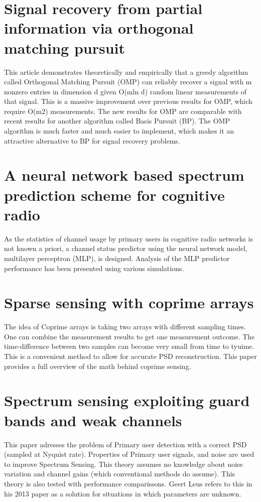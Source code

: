 \documentclass[report, oneside, a4paper, openany]{memoir}
\begin{document}
\section{Signal recovery from partial information via orthogonal matching pursuit \cite{tropp2005signal}}
This article demonstrates theoretically and empirically that a greedy algorithm called
Orthogonal Matching Pursuit (OMP) can reliably recover a signal with m nonzero entries in dimension
d given O(mln d) random linear measurements of that signal. This is a massive improvement
over previous results for OMP, which require O(m2) measurements. The new results for OMP are
comparable with recent results for another algorithm called Basis Pursuit (BP). The OMP algorithm
is much faster and much easier to implement, which makes it an attractive alternative to BP
for signal recovery problems.
\section{A neural network based spectrum prediction scheme for cognitive radio \cite{tumuluru2010neural}}
As the statistics of channel usage by primary users in cognitive radio networks is not known a priori, a channel status predictor using the neural network model, multilayer perceptron (MLP), is designed. Analysis of the MLP predictor performance has been presented using various simulations.
\section{Sparse sensing with coprime arrays \cite{vaidyanathan2010sparse}}
The idea of Coprime arrays is taking two arrays with different sampling times. One can combine the measurement results to get one measurement outcome. The time-difference between two samples can become very small from time to tyuime. This is a convenient method to allow for accurate PSD reconstruction. This paper provides a full overview of the math behind coprime sensing.
\section{Spectrum sensing exploiting guard bands and weak channels \cite{vazquez2011spectrum}}
This paper adresses the problem of Primary user detection with a correct PSD (sampled at Nyquist rate). Properties of Primary user signals, and noise are used to improve Spectrum Sensing. This theory assumes no knowledge about noise variation and channel gains (which conventional methods do assume). This theory is also tested with performance comparissons. Geert Leus refers to this in his 2013 paper as a solution for situations in which parameters are unknown. 
\end{document}
